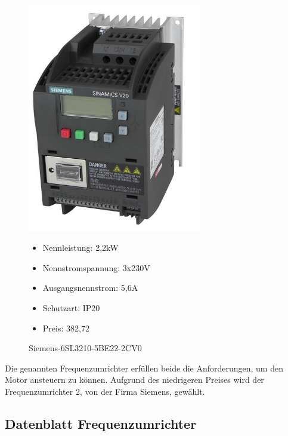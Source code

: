 \begin{figure}
\begin{minipage}[t]{0.45\textwidth}
\end{minipage}
\hspace{0.1\textwidth}
\begin{minipage}[t]{0.45\textwidth}

\includegraphics[width=0.68\textwidth]{SiemensV20}
\caption{Siemens-6SL3210-5BE22-2CV0}

\begin{itemize}
	\item{Nennleistung: 2,2kW}
	\item{Nennstromspannung: 3x230V}
	\item{Ausgangsnennstrom: 5,6A}
	\item{Schutzart: IP20}
	\item{Preis: 382,72\textsf{\texteuro}}
\end{itemize}

\end{minipage}
\end{figure}

Die genannten Frequenzumrichter erfüllen beide die Anforderungen, um den Motor ansteuern zu können. Aufgrund des niedrigeren Preises wird der Frequenzumrichter 2, von der Firma Siemens, gewählt. 

\subsection{Datenblatt Frequenzumrichter}
\label{sec:datenblattFrequenzumrichter}


